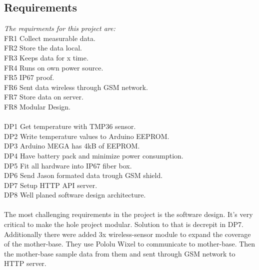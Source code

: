 \subsection{Requirements}
\textit{The requirments for this project are:}\\
FR1 Collect measurable data.\\
FR2 Store the data local.\\
FR3 Keeps data for x time.\\
FR4 Runs on own power source.\\
FR5 IP67 proof.\\
FR6 Sent data wireless through GSM network.\\
FR7 Store data on server.\\
FR8 Modular Design.\\
\\
DP1 Get temperature with TMP36 sensor.\\
DP2 Write temperature values to Arduino EEPROM.\\
DP3 Arduino MEGA has 4kB of EEPROM.\\
DP4 Have battery pack and minimize power consumption.\\
DP5 Fit all hardware into IP67 fiber box.\\
DP6 Send Jason formated data trough GSM shield.\\
DP7 Setup HTTP API server.\\
DP8 Well planed software design architecture.\\
\\
The most challenging requirements in the project is the software design. It's very critical to make the hole project modular. Solution to that is decrepit in DP7. Additionally there were added 3x wireless-sensor module to expand the coverage of the mother-base. They use Pololu Wixel to communicate to mother-base. Then the mother-base sample data from them and sent through GSM network to HTTP server.

